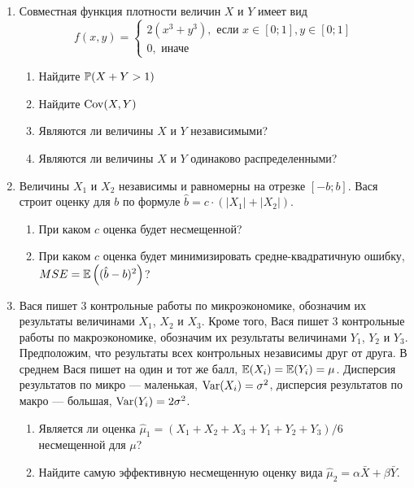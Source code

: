 \begin{enumerate}

\item Совместная функция плотности величин $X$ и $Y$ имеет вид
\[
f(x,y) = \begin{cases}
2(x^3+y^3), \mbox{ если } x\in [0;1], y\in [0;1] \\
0, \mbox{ иначе}
\end{cases}
\]
\begin{enumerate}
\item Найдите $\P(X + Y > 1)$
\item Найдите $\Cov(X, Y)$
\item Являются ли величины $X$ и $Y$ независимыми?
\item Являются ли величины $X$ и $Y$ одинаково распределенными?
\end{enumerate}

\item Величины $X_1$ и $X_2$ независимы и равномерны на отрезке $[-b;b]$.
Вася строит оценку для $b$ по формуле $\hat{b}=c\cdot (|X_{1}|+|X_{2}|)$.
\begin{enumerate}
\item При каком $c$ оценка будет несмещенной?
\item При каком $c$ оценка будет минимизировать средне-квадратичную ошибку,
$MSE=\E\left((\hat{b}-b)^{2}\right)$?
\end{enumerate}

\item Вася пишет 3 контрольные работы по микроэкономике, обозначим их результаты
величинами $X_1$, $X_2$ и $X_3$. Кроме того, Вася пишет 3 контрольные работы по
макроэкономике, обозначим их результаты величинами $Y_1$, $Y_2$ и $Y_3$. Предположим,
что результаты всех контрольных независимы друг от друга. В среднем Вася пишет на
один и тот же балл, $\E(X_i)=\E(Y_i)=\mu$. Дисперсия результатов по микро — маленькая,
$\Var(X_i)=\sigma^2$, дисперсия результатов по макро — большая, $\Var(Y_i)=2\sigma^2$.
\begin{enumerate}
\item Является ли оценка $\hat{\mu}_1=(X_1+X_2+X_3+Y_1+Y_2+Y_3)/6$ несмещенной для $\mu$?
\item Найдите самую эффективную несмещенную оценку вида $\hat{\mu}_2 = \alpha \bar{X} + \beta \bar{Y}$.
\end{enumerate}


\end{enumerate}

